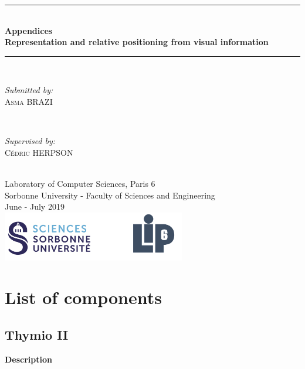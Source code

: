 \documentclass[12pt]{report}
\begin{document}
	\begin{titlepage}
		
		\newcommand{\HRule}{\rule{\linewidth}{0.5mm}} %
		
		\center 
		\HRule \\[0.4cm]
		{ \huge \bfseries Appendices \\Representation and relative positioning from visual information}\\[0.4cm]
		\HRule \\[1.5cm]
		
		\begin{minipage}{0.4\textwidth}
			\begin{flushleft} \large
				\emph{Submitted by:}\\
				\textsc{Asma BRAZI}
			\end{flushleft}
		\end{minipage}
		~
		\begin{minipage}{0.4\textwidth}
			\begin{flushright} \large
				\emph{Supervised by:} \\
				\textsc{Cédric HERPSON}\\
			\end{flushright}
		\end{minipage}\\[4cm]
		
		
		{\large Laboratory of Computer Sciences, Paris 6 \\ Sorbonne University - Faculty of Sciences and Engineering}\\[3cm] 
		{\large June - July 2019 }\\[3cm] 
		\includegraphics[width=0.6\textwidth]{res/logo.png}\\[1cm] 
		\vfill %
		
	\end{titlepage}
	
	\tableofcontents
	\appendix
	\chapter{List of components}
	\section{Thymio II}
	\textbf{Description} 
\end{document}
